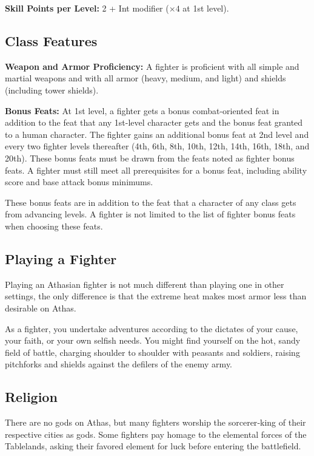 \textbf{Skill Points per Level:} 2 + Int modifier ($\times4$ at 1st level).

\subsection{Class Features}

\textbf{Weapon and Armor Proficiency:} A fighter is proficient with all simple and martial weapons and with all armor (heavy, medium, and light) and shields (including tower shields).

\textbf{Bonus Feats:} At 1st level, a fighter gets a bonus combat-oriented feat in addition to the feat that any 1st-level character gets and the bonus feat granted to a human character. The fighter gains an additional bonus feat at 2nd level and every two fighter levels thereafter (4th, 6th, 8th, 10th, 12th, 14th, 16th, 18th, and 20th). These bonus feats must be drawn from the feats noted as fighter bonus feats. A fighter must still meet all prerequisites for a bonus feat, including ability score and base attack bonus minimums.

These bonus feats are in addition to the feat that a character of any class gets from advancing levels. A fighter is not limited to the list of fighter bonus feats when choosing these feats.

\subsection{Playing a Fighter}

Playing an Athasian fighter is not much different than playing one in other settings, the only difference is that the extreme heat makes most armor less than desirable on Athas.

As a fighter, you undertake adventures according to the dictates of your cause, your faith, or your own selfish needs. You might find yourself on the hot, sandy field of battle, charging shoulder to shoulder with peasants and soldiers, raising pitchforks and shields against the defilers of the enemy army.

\subsection{Religion}

There are no gods on Athas, but many fighters worship the sorcerer‐king of their respective cities as gods. Some fighters pay homage to the elemental forces of the Tablelands, asking their favored element for luck before entering the battlefield.

